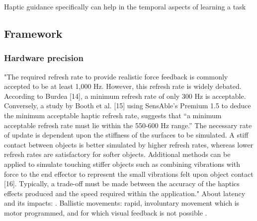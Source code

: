Haptic guidance specifically can help in the temporal aspects of learning a task \cite{Feygin2002HapticSkill} 

\subsection{Framework}

\subsubsection{Hardware precision}
"The required refresh rate to provide realistic
force feedback is commonly accepted to be at least 1,000 Hz.
However, this refresh rate is widely debated. According to
Burdea [14], a minimum refresh rate of only 300 Hz is
acceptable. Conversely, a study by Booth et al. [15] using
SensAble’s Premium 1.5 to deduce the minimum acceptable
haptic refresh rate, suggests that “a minimum acceptable
refresh rate must lie within the 550-600 Hz range.” The
necessary rate of update is dependent upon the stiffness of
the surfaces to be simulated. A stiff contact between objects is
better simulated by higher refresh rates, whereas lower
refresh rates are satisfactory for softer objects. Additional
methods can be applied to simulate touching stiffer objects
such as combining vibrations with force to the end effector to
represent the small vibrations felt upon object contact [16].
Typically, a trade-off must be made between the accuracy of
the haptics effects produced and the speed required within
the application." \cite{Coles2011TheArt}
About latency and its impacts: \cite{Gourishetti2018PassiveFeedback}.
Ballistic movements: rapid, involuntary movement which is motor programmed, and for which visual feedback is not possible \cite{Wall2000}.
